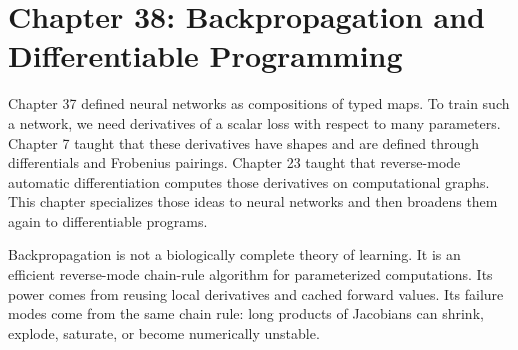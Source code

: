 \section{Chapter 38: Backpropagation and Differentiable Programming}
\label{ch:backpropagation-differentiable-programming}

Chapter 37 defined neural networks as compositions of typed maps. To train such a network, we need derivatives of a scalar loss with respect to many parameters. Chapter 7 taught that these derivatives have shapes and are defined through differentials and Frobenius pairings. Chapter 23 taught that reverse-mode automatic differentiation computes those derivatives on computational graphs. This chapter specializes those ideas to neural networks and then broadens them again to differentiable programs.

Backpropagation is not a biologically complete theory of learning. It is an efficient reverse-mode chain-rule algorithm for parameterized computations. Its power comes from reusing local derivatives and cached forward values. Its failure modes come from the same chain rule: long products of Jacobians can shrink, explode, saturate, or become numerically unstable.

